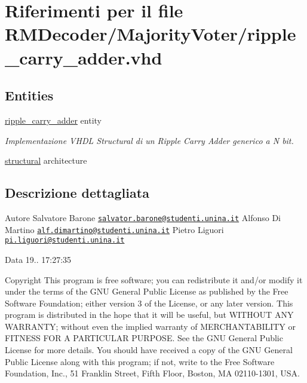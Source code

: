 \hypertarget{ripple__carry__adder_8vhd}{\section{Riferimenti per il file R\+M\+Decoder/\+Majority\+Voter/ripple\+\_\+carry\+\_\+adder.vhd}
\label{ripple__carry__adder_8vhd}
}
\subsection*{Entities}
\begin{DoxyCompactItemize}
\item 
\hyperlink{classripple__carry__adder}{ripple\+\_\+carry\+\_\+adder} entity
\begin{DoxyCompactList}\small\item\em Implementazione V\+H\+D\+L Structural di un Ripple Carry Adder generico a N bit. \end{DoxyCompactList}\item 
\hyperlink{classripple__carry__adder_1_1structural}{structural} architecture
\end{DoxyCompactItemize}


\subsection{Descrizione dettagliata}
\begin{DoxyAuthor}{Autore}
Salvatore Barone \href{mailto:salvator.barone@studenti.unina.it}{\tt salvator.\+barone@studenti.\+unina.\+it} Alfonso Di Martino \href{mailto:alf.dimartino@studenti.unina.it}{\tt alf.\+dimartino@studenti.\+unina.\+it} Pietro Liguori \href{mailto:pi.liguori@studenti.unina.it}{\tt pi.\+liguori@studenti.\+unina.\+it} 
\end{DoxyAuthor}
\begin{DoxyDate}{Data}
19.. 17\+:27\+:35
\end{DoxyDate}
\begin{DoxyCopyright}{Copyright}
This program is free software; you can redistribute it and/or modify it under the terms of the G\+N\+U General Public License as published by the Free Software Foundation; either version 3 of the License, or any later version. This program is distributed in the hope that it will be useful, but W\+I\+T\+H\+O\+U\+T A\+N\+Y W\+A\+R\+R\+A\+N\+T\+Y; without even the implied warranty of M\+E\+R\+C\+H\+A\+N\+T\+A\+B\+I\+L\+I\+T\+Y or F\+I\+T\+N\+E\+S\+S F\+O\+R A P\+A\+R\+T\+I\+C\+U\+L\+A\+R P\+U\+R\+P\+O\+S\+E. See the G\+N\+U General Public License for more details. You should have received a copy of the G\+N\+U General Public License along with this program; if not, write to the Free Software Foundation, Inc., 51 Franklin Street, Fifth Floor, Boston, M\+A 02110-\/1301, U\+S\+A. 
\end{DoxyCopyright}
